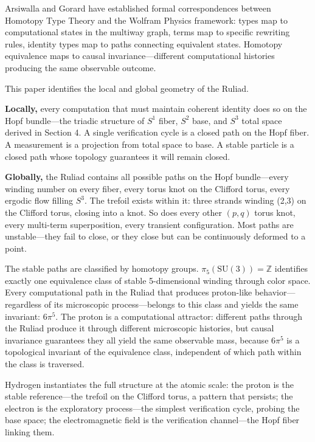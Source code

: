\documentclass[12pt]{article}
\begin{document}
Arsiwalla and Gorard \cite{arsiwalla2021, gorard2020} have established formal correspondences between Homotopy Type Theory and the Wolfram Physics framework: types map to computational states in the multiway graph, terms map to specific rewriting rules, identity types map to paths connecting equivalent states. Homotopy equivalence maps to causal invariance---different computational histories producing the same observable outcome.

This paper identifies the local and global geometry of the Ruliad.

\textbf{Locally,} every computation that must maintain coherent identity does so on the Hopf bundle---the triadic structure of $S^1$ fiber, $S^2$ base, and $S^3$ total space derived in Section 4. A single verification cycle is a closed path on the Hopf fiber. A measurement is a projection from total space to base. A stable particle is a closed path whose topology guarantees it will remain closed.

\textbf{Globally,} the Ruliad contains all possible paths on the Hopf bundle---every winding number on every fiber, every torus knot on the Clifford torus, every ergodic flow filling $S^3$. The trefoil exists within it: three strands winding (2,3) on the Clifford torus, closing into a knot. So does every other $(p,q)$ torus knot, every multi-term superposition, every transient configuration. Most paths are unstable---they fail to close, or they close but can be continuously deformed to a point.

The stable paths are classified by homotopy groups. $\pi_5(\mathrm{SU}(3)) = \mathbb{Z}$ identifies exactly one equivalence class of stable 5-dimensional winding through color space. Every computational path in the Ruliad that produces proton-like behavior---regardless of its microscopic process---belongs to this class and yields the same invariant: $6\pi^5$. The proton is a computational attractor: different paths through the Ruliad produce it through different microscopic histories, but causal invariance guarantees they all yield the same observable mass, because $6\pi^5$ is a topological invariant of the equivalence class, independent of which path within the class is traversed.

Hydrogen instantiates the full structure at the atomic scale: the proton is the stable reference---the trefoil on the Clifford torus, a pattern that persists; the electron is the exploratory process---the simplest verification cycle, probing the base space; the electromagnetic field is the verification channel---the Hopf fiber linking them. 
\end{document}
